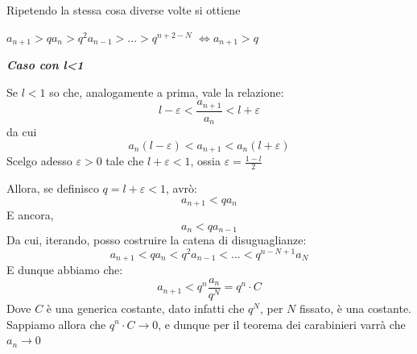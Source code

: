 \documentclass{article}
\theoremstyle{definition}
\begin{document}
Ripetendo la stessa cosa diverse volte si ottiene
\begin{center}
    $a_{n+1}>qa_n>q^2a_{n-1}>...>q^{n+2-N}$ $\Longleftrightarrow a_{n+1}>q$



    \begin{center}
        \textbf{\textit{Caso con l<1}}
    \end{center}
Se $l<1$ so che, analogamente a prima, vale la relazione:
\begin{equation}
    l-\varepsilon< \frac{a_{n+1}}{a_n}< l+ \varepsilon
\end{equation}
da cui
\begin{equation}
    a_n(l-\varepsilon)< a_{n+1} < a_n (l+\varepsilon)
\end{equation}
    Scelgo adesso $\varepsilon > 0$ tale che $l+ \varepsilon < 1$, ossia $\varepsilon= \frac{1-l}{2}$
\end{center}
Allora, se definisco $q=l+\varepsilon <1$, avrò:
\begin{equation}
    a_{n+1} < qa_n
\end{equation}
E ancora,
\begin{equation}
    a_n < q a_{n-1}
\end{equation}
Da cui, iterando, posso costruire la catena di disuguaglianze:
\begin{equation}
    a_{n+1} < q a_n < q^2 a_{n-1} < ... < q^{n-N+1}a_{N}
\end{equation}
E dunque abbiamo che:
\begin{equation}
    a_{n+1} < q^n \frac{a_n}{q^N}=q^n \cdot C
\end{equation}
Dove $C$ è una generica costante, dato infatti che $q^N$, per $N$ fissato, è una costante.
\\
Sappiamo allora che $q^n \cdot C \to 0$, e dunque per il teorema dei carabinieri varrà che $a_n \to 0$
\end{document}
